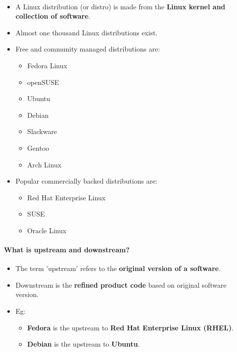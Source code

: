 \setlength{\columnsep}{5pt}
\begin{flushleft}
	\paragraph{}
	\begin{itemize}
		\item A Linux distribution (or distro) is made from the \textbf{Linux kernel and collection of software}.
		\item Almost one thousand Linux distributions exist.
		\item Free and community managed distributions are:
		\begin{itemize}
			\item Fedora Linux 
			\item openSUSE
			\item Ubuntu
			\item Debian
			\item Slackware
			\item Gentoo 
			\item Arch Linux
		\end{itemize}
		\item Popular commercially backed distributions are:
		\begin{itemize}
			\item Red Hat Enterprise Linux
			\item SUSE
			\item Oracle Linux
		\end{itemize}
	\end{itemize}
	\paragraph{What is upstream and downstream?}
	\begin{itemize}
		\item The term 'upstream' refers to the \textbf{original version of a software}.
		\item Downstream is the \textbf{refined product code} based on original software version.
		\item Eg:
		\begin{itemize}
			\item \textbf{Fedora} is the upstream to \textbf{Red Hat Enterprise Linux (RHEL)}.
			\item \textbf{Debian} is the upstream to \textbf{Ubuntu}.
		\end{itemize}
	\end{itemize}
\end{flushleft}
\newpage
